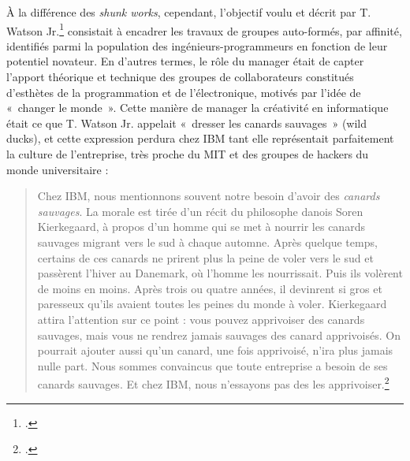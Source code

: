 \documentclass{FramateX}
\begin{document}
\begin{refsection}
À la différence des \textit{shunk works}, cependant,
l'objectif voulu et décrit par T. Watson
Jr.\footnote{\cite{watsonbusiness2003}.}
consistait à encadrer les travaux de groupes auto-formés, par affinité,
identifiés parmi la population des ingénieurs-programmeurs en fonction
de leur potentiel novateur. En d'autres termes, le
rôle du manager était de capter l'apport théorique et
technique des groupes de collaborateurs constitués
d'esthètes de la programmation et de l'électronique,
motivés par l'idée de «~changer le monde~». Cette
manière de manager la créativité en informatique était ce que T. Watson
Jr. appelait «~dresser les canards sauvages~» (wild ducks), et cette
expression perdura chez IBM tant elle représentait parfaitement la
culture de l'entreprise, très proche du MIT et des
groupes de hackers du monde universitaire :

\begin{quote}
Chez IBM, nous mentionnons souvent notre besoin
d'avoir des \textit{canards sauvages}. La morale est
tirée d'un récit du philosophe danois Soren
Kierkegaard, à propos d'un homme qui se met à nourrir
les canards sauvages migrant vers le sud à chaque automne. Après
quelque temps, certains de ces canards ne prirent plus la peine de
voler vers le sud et passèrent l'hiver au Danemark, où
l'homme les nourrissait. Puis ils volèrent de moins en
moins. Après trois ou quatre années, il devinrent si gros et paresseux
qu'ils avaient toutes les peines du monde à voler.
Kierkegaard attira l'attention sur ce point : vous
pouvez apprivoiser des canards sauvages, mais vous ne rendrez jamais
sauvages des canard apprivoisés. On pourrait ajouter aussi
qu'un canard, une fois apprivoisé,
n'ira plus jamais nulle part. Nous sommes convaincus
que toute entreprise a besoin de ses canards sauvages. Et chez IBM,
nous n'essayons pas des les
apprivoiser.\footnote{\cite[p.~14]{watsonbusiness2003}.} 


\end{quote}
\end{refsection}
\end{document}
